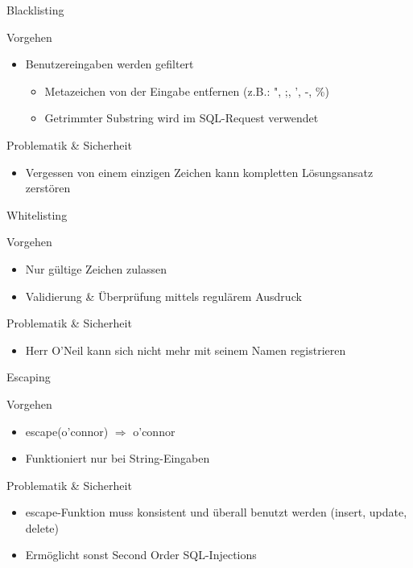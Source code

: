 \begin{frame}{Blacklisting}
\begin{block}{Vorgehen}
\begin{itemize}
\item Benutzereingaben werden gefiltert
	\begin{itemize}
	\item Metazeichen von der Eingabe entfernen (z.B.: ", ;, ', -, \%)
	\item Getrimmter Substring wird im SQL-Request verwendet
	\end{itemize}
\end{itemize}
\end{block}
\begin{block}{Problematik \& Sicherheit}	
\begin{itemize}
\item Vergessen von einem einzigen Zeichen kann kompletten Lösungsansatz zerstören
\end{itemize}
\end{block}
\end{frame}

\begin{frame}{Whitelisting}
\begin{block}{Vorgehen}
\begin{itemize}
	\item Nur gültige Zeichen zulassen
	\item Validierung \& Überprüfung mittels regulärem Ausdruck
\end{itemize}	
\end{block}
\begin{block}{Problematik \& Sicherheit}	
\begin{itemize}
\item Herr O'Neil kann sich nicht mehr mit seinem Namen registrieren
\end{itemize}
\end{block}
\end{frame}


\begin{frame}{Escaping}
\begin{block}{Vorgehen}
\begin{itemize}
\item escape(o'connor) $\Rightarrow$ o'connor
\item Funktioniert nur bei String-Eingaben
\end{itemize}
\end{block}
\begin{block}{Problematik \& Sicherheit}
\begin{itemize}
\item escape-Funktion muss konsistent und überall benutzt werden (insert, update, delete)	
\item Ermöglicht sonst Second Order SQL-Injections
\end{itemize}
\end{block}
\end{frame}

